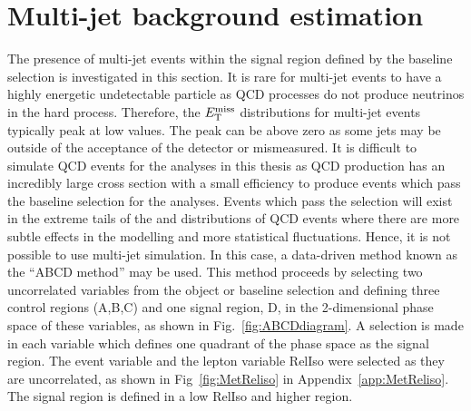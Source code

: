 \section{Multi-jet background estimation}
\label{sec:QCDbackground}
The presence of multi-jet events within the signal region defined by the baseline selection is investigated in this section. It is rare for multi-jet events to have a highly energetic undetectable particle as QCD processes do not produce neutrinos in the hard process. Therefore, the $E_{\mathrm{T}}^{\text{miss}}$ distributions for multi-jet events typically peak at low values. The peak can be above zero as some jets may be outside of the acceptance of the detector or mismeasured.  It is difficult to simulate QCD events for the analyses in this thesis as QCD production has an incredibly large cross section with a small efficiency to produce events which pass the baseline selection for the \tttt analyses. Events which pass the selection will exist in the extreme tails of the \njets and \nbtags distributions of QCD events where there are more subtle effects in the modelling and more statistical fluctuations. Hence, it is not possible to use multi-jet simulation. In this case, a data-driven method known as the ``ABCD method'' may be used. This method proceeds by selecting two uncorrelated variables from the object or baseline selection and defining three control regions (A,B,C) and one signal region, D, in the 2-dimensional phase space of these variables, as shown in Fig.~\ref{fig:ABCDdiagram}. A selection is made in each variable which defines one quadrant of the phase space as the signal region.  The event variable \MET and the lepton variable RelIso were selected as they are uncorrelated, as shown in Fig~\ref{fig:MetReliso} in Appendix~\ref{app:MetReliso}. The signal region is defined in a low RelIso and higher \MET region.\\
